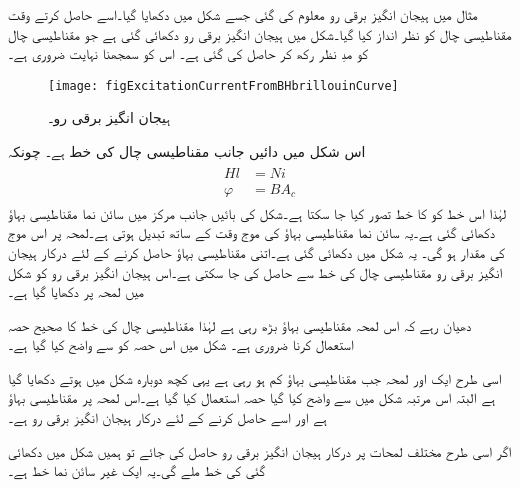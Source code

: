 مثال میں ہیجان انگیز برقی رو معلوم کی گئی جسے شکل  میں دکھایا گیا۔اسے حاصل کرتے وقت مقناطیسی چال کو نظر انداز کیا گیا۔شکل  میں ہیجان انگیز برقی رو دکھائی گئی ہے جو مقناطیسی چال کو مدِ نظر رکھ کر حاصل کی گئی ہے۔ اس کو سمجھنا نہایت ضروری ہے۔
\begin{figure}
\centering
\texttt{[image: figExcitationCurrentFromBHbrillouinCurve]}
\caption{ہیجان انگیز برقی رو۔}
\label{شکل_مقناطیسی_ادوار_ہیجان_رو_بشمول_اثر_چال}
\end{figure}
اس شکل  میں دائیں جانب مقناطیسی چال کی خط ہے۔ چونکہ 
\begin{gather}
\begin{aligned}
H l& =N i\\
\varphi&=B A_c
\end{aligned}
\end{gather}
لہٰذا اس خط کو  کا خط تصور کیا جا سکتا ہے۔شکل کی بائیں جانب مرکز میں سائن نما مقناطیسی بہاؤ  دکھائی گئی ہے۔یہ سائن نما مقناطیسی بہاؤ کی موج وقت کے ساتھ تبدیل ہوتی ہے۔لمحہ  پر اس موج کی مقدار   ہو گی۔ یہ شکل میں دکھائی گئی ہے۔اتنی مقناطیسی بہاؤ حاصل کرنے کے لئے درکار ہیجان انگیز برقی رو  مقناطیسی چال کی خط سے حاصل کی جا سکتی ہے۔اس  ہیجان انگیز برقی رو کو شکل میں لمحہ  پر دکھایا گیا ہے۔ 

دھیان رہے کہ اس لمحہ مقناطیسی بہاؤ بڑھ رہی ہے لہٰذا مقناطیسی چال کی خط کا صحیح حصہ استعمال کرنا ضروری ہے۔ شکل  میں اس حصہ  کو  سے واضح کیا گیا ہے۔

اسی طرح ایک اور لمحہ  جب مقناطیسی بہاؤ کم ہو رہی ہے یہی کچھ دوبارہ شکل میں ہوتے دکھایا گیا ہے البتہ اس مرتبہ شکل میں  سے واضح کیا گیا حصہ استعمال کیا گیا ہے۔اس لمحہ پر مقناطیسی بہاؤ  ہے اور اسے حاصل کرنے کے لئے درکار ہیجان انگیز برقی رو  ہے۔

اگر اسی طرح مختلف لمحات پر درکار ہیجان انگیز برقی رو حاصل کی جائے تو ہمیں شکل میں دکھائی گئی   کی خط ملے گی۔یہ ایک غیر سائن نما خط ہے۔

